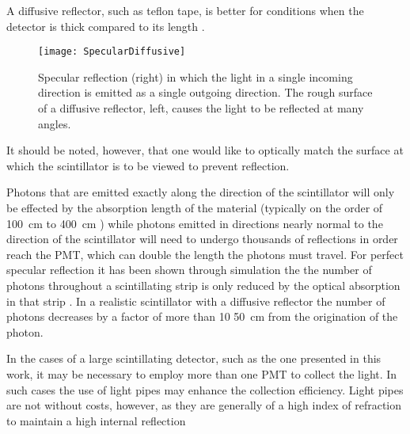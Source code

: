 A diffusive reflector, such as teflon tape, is better for conditions when the detector is thick compared to its length \cite{knoll_radiation_2009}.
\begin{figure}
	\centering
	\texttt{[image: SpecularDiffusive]}
	\caption[Specular and Diffusive Reflection]{Specular reflection (right) in which the light in a single incoming direction is emitted as a single outgoing direction. The rough surface of a diffusive reflector, left, causes the light to be reflected at many angles.}
	\label{fig:SpecularDiffusive} 
\end{figure}
It should be noted, however, that one would like to optically match the surface at which the scintillator is to be viewed to prevent reflection.

Photons that are emitted exactly along the direction of the scintillator will only be effected by the  absorption length of the material (typically on the order of \SI{100}{\cm} to \SI{400}{\cm} \cite{SG_PlasticScint_2008}) while photons emitted in directions nearly normal to the direction of the scintillator will need to undergo thousands of reflections in order reach the PMT, which can double the length the photons must travel.
For perfect specular reflection it has been shown through simulation the the number of photons throughout a scintillating strip is only reduced by the optical absorption in that strip \cite{riggi_introducing_2011}.
In a realistic scintillator with a diffusive reflector the number of photons decreases by a factor of more than 10 \SI{50}{\cm} from the origination of the photon\cite{riggi_introducing_2011}.

In the cases of a large scintillating detector, such as the one presented in this work, it  may be necessary to employ more than one PMT to collect the light.
In such cases the use of light pipes may enhance the collection efficiency. 
Light pipes are not without costs, however, as they are generally of a high index of refraction to maintain a high internal reflection

